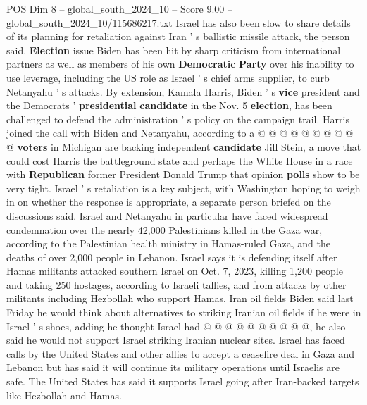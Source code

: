 \begin{textsample}{POS Dim 8 – global\_south\_2024\_10 – Score 9.00 – global\_south\_2024\_10/115686217.txt}
Israel has also been slow to share details of its planning for retaliation against Iran ' s ballistic missile attack, the person said. \textbf{Election} issue Biden has been hit by sharp criticism from international partners as well as members of his own \textbf{Democratic} \textbf{Party} over his inability to use leverage, including the US role as Israel ' s chief arms supplier, to curb Netanyahu ' s attacks.
By extension, Kamala Harris, Biden ' s \textbf{vice} president and the Democrats ' \textbf{presidential} \textbf{candidate} in the Nov. 5 \textbf{election}, has been challenged to defend the administration ' s policy on the campaign trail.
Harris joined the call with Biden and Netanyahu, according to a @ @ @ @ @ @ @ @ @ @ \textbf{voters} in Michigan are backing independent \textbf{candidate} Jill Stein, a move that could cost Harris the battleground state and perhaps the White House in a race with \textbf{Republican} former President Donald Trump that opinion \textbf{polls} show to be very tight.
Israel ' s retaliation is a key subject, with Washington hoping to weigh in on whether the response is appropriate, a separate person briefed on the discussions said.
Israel and Netanyahu in particular have faced widespread condemnation over the nearly 42,000 Palestinians killed in the Gaza war, according to the Palestinian health ministry in Hamas-ruled Gaza, and the deaths of over 2,000 people in Lebanon.
Israel says it is defending itself after Hamas militants attacked southern Israel on Oct. 7, 2023, killing 1,200 people and taking 250 hostages, according to Israeli tallies, and from attacks by other militants including Hezbollah who support Hamas.
Iran oil fields Biden said last Friday he would think about alternatives to striking Iranian oil fields if he were in Israel ' s shoes, adding he thought Israel had @ @ @ @ @ @ @ @ @ @, he also said he would not support Israel striking Iranian nuclear sites.
Israel has faced calls by the United States and other allies to accept a ceasefire deal in Gaza and Lebanon but has said it will continue its military operations until Israelis are safe.
The United States has said it supports Israel going after Iran-backed targets like Hezbollah and Hamas.

\end{textsample}
